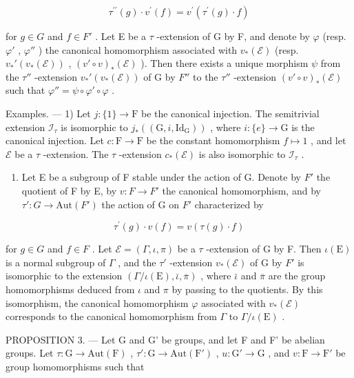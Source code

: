 \[
\tau^ {\prime \prime} (g) \cdot v ^ {\prime} (f) = v ^ {\prime} (\tau^ {\prime} (g) \cdot f)
\]

for \(g \in G\) and \(f \in F'\) . Let E be a \(\tau\) -extension of G by F, and denote by \(\varphi\) (resp. \(\varphi'\) , \(\varphi''\) ) the canonical homomorphism associated with \(v_{*}(\mathcal{E})\) (resp. \(v_{*}'(v_{*}(\mathcal{E}))\) , \((v' \circ v)_{*}(\mathcal{E})\) ). Then there exists a unique morphism \(\psi\) from the \(\tau''\) -extension \(v_{*}'(v_{*}(\mathcal{E}))\) of G by \(F''\) to the \(\tau''\) -extension \((v' \circ v)_{*}(\mathcal{E})\) such that \(\varphi'' = \psi \circ \varphi' \circ \varphi\) .

Examples. --- 1) Let \(j: \{1\} \to \mathrm{F}\) be the canonical injection. The semitrivial extension \(\mathcal{I}_{\tau}\) is isomorphic to \(j_{*}((\mathrm{G}, i, \mathrm{Id}_{\mathrm{G}}))\) , where \(i: \{e\} \to \mathrm{G}\) is the canonical injection. Let \(c: \mathrm{F} \to \mathrm{F}\) be the constant homomorphism \(f \mapsto 1\) , and let \(\mathcal{E}\) be a \(\tau\) -extension. The \(\tau\) -extension \(c_{*}(\mathcal{E})\) is also isomorphic to \(\mathcal{I}_{\tau}\) .

\begin{enumerate}
\def\labelenumi{\arabic{enumi})}
\setcounter{enumi}{1}
\tightlist
\item
  Let E be a subgroup of F stable under the action of G. Denote by \(F'\) the quotient of F by E, by \(v : F \to F'\) the canonical homomorphism, and by \(\tau' : G \to \text{Aut}(F')\) the action of G on \(F'\) characterized by
\end{enumerate}

\[
\tau^ {\prime} (g) \cdot v (f) = v (\tau (g) \cdot f)
\]

for \(g \in G\) and \(f \in F\) . Let \(\mathcal{E} = (\Gamma, \iota, \pi)\) be a \(\tau\) -extension of G by F. Then \(\iota(\mathrm{E})\) is a normal subgroup of \(\Gamma\) , and the \(\tau'\) -extension \(v_{*}(\mathcal{E})\) of G by \(F'\) is isomorphic to the extension \((\Gamma/\iota(\mathrm{E}), \bar{\iota}, \overline{\pi})\) , where \(\bar{\iota}\) and \(\overline{\pi}\) are the group homomorphisms deduced from \(\iota\) and \(\pi\) by passing to the quotients. By this isomorphism, the canonical homomorphism \(\varphi\) associated with \(v_{*}(\mathcal{E})\) corresponds to the canonical homomorphism from \(\Gamma\) to \(\Gamma/\iota(\mathrm{E})\) .

PROPOSITION 3. --- Let G and G' be groups, and let F and F' be abelian groups. Let \(\tau: \mathrm{G} \to \mathrm{Aut}(\mathrm{F})\) , \(\tau': \mathrm{G} \to \mathrm{Aut}(\mathrm{F}')\) , \(u: \mathrm{G}' \to \mathrm{G}\) , and \(v: \mathrm{F} \to \mathrm{F}'\) be group homomorphisms such that

